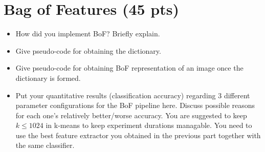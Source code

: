 \documentclass[12pt]{article}
\begin{document}
\section{Bag of Features (45 pts)}
    \begin{itemize}
        \item How did you implement BoF? Briefly explain.
        \item Give pseudo-code for obtaining the dictionary.
        \item Give pseudo-code for obtaining BoF representation of an image once the dictionary is formed. 
        \item Put your quantitative results (classification accuracy) regarding 3 different parameter configurations for the BoF pipeline here. Discuss possible reasons for each one's relatively better/worse accuracy. You are suggested to keep $k \leq 1024$ in k-means to keep experiment durations managable. You need to use the best feature extractor you obtained in the previous part together with the same classifier.
    \end{itemize}
\end{document}
